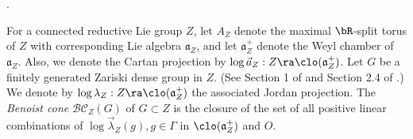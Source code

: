 %


. 

For a connected reductive Lie group $Z$,  
let $A_Z$ denote the maximal $\bR$-split torus of $Z$  with  corresponding 
Lie algebra $\mathfrak{a}_Z$, and 
 let $\mathfrak{a}_Z^+$ denote the Weyl chamber of $\mathfrak{a}_Z$.
Also, we denote 
the Cartan projection by $\log \vec{a}_Z: Z \ra \clo(\mathfrak{a}^+_Z)$.
Let $G$ be a finitely generated Zariski dense group in $Z$. (See Section 1 of \cite{BS2021} 
and Section 2.4 of \cite{GGKW17ii}.)
We denote by $\log \lambda_{Z}: Z \ra  \clo(\mathfrak{a}^+_Z)$ the associated 
Jordan projection.
The {\em Benoist cone}  $\mathcal{BC}_Z(G)$ of 
$G \subset Z$ is the closure of the set of 
all positive linear combinations of 
$\log \vec{\lambda}_Z(g), g\in \Gamma$ in $\clo(\mathfrak{a}^+_Z)$ and $O$.

